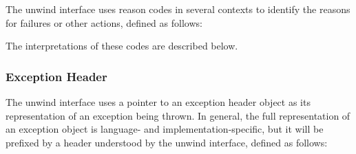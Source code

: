 The unwind interface uses reason codes in several contexts to identify the
reasons for failures or other actions, defined as follows:


The interpretations of these codes are described below.

\subsubsection{Exception Header}

The unwind interface uses a pointer to an exception header object
as its representation of an exception being thrown. In general,
the full representation of an exception object is language- and
implementation-specific, but it will be prefixed by a header understood
by the unwind interface, defined as follows:



